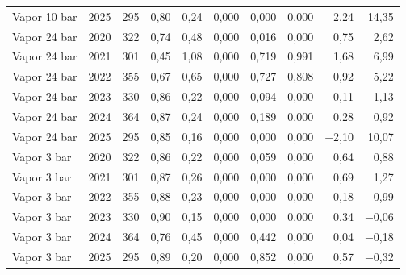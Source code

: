 {\begin{xltabular}{\linewidth}{@{}lrrrrrrrrr@{}}
Vapor 10 bar & 2025 & 295 & 0,80 & 0,24 & 0,000 & 0,000 & 0,000 & 2,24 & 14,35 \\
Vapor 24 bar & 2020 & 322 & 0,74 & 0,48 & 0,000 & 0,016 & 0,000 & 0,75 & 2,62 \\
Vapor 24 bar & 2021 & 301 & 0,45 & 1,08 & 0,000 & 0,719 & 0,991 & 1,68 & 6,99 \\
Vapor 24 bar & 2022 & 355 & 0,67 & 0,65 & 0,000 & 0,727 & 0,808 & 0,92 & 5,22 \\
Vapor 24 bar & 2023 & 330 & 0,86 & 0,22 & 0,000 & 0,094 & 0,000 & $-$0,11 & 1,13 \\
Vapor 24 bar & 2024 & 364 & 0,87 & 0,24 & 0,000 & 0,189 & 0,000 & 0,28 & 0,92 \\
Vapor 24 bar & 2025 & 295 & 0,85 & 0,16 & 0,000 & 0,000 & 0,000 & $-$2,10 & 10,07 \\
Vapor 3 bar & 2020 & 322 & 0,86 & 0,22 & 0,000 & 0,059 & 0,000 & 0,64 & 0,88 \\
Vapor 3 bar & 2021 & 301 & 0,87 & 0,26 & 0,000 & 0,000 & 0,000 & 0,69 & 1,27 \\
Vapor 3 bar & 2022 & 355 & 0,88 & 0,23 & 0,000 & 0,000 & 0,000 & 0,18 & $-$0,99 \\
Vapor 3 bar & 2023 & 330 & 0,90 & 0,15 & 0,000 & 0,000 & 0,000 & 0,34 & $-$0,06 \\
Vapor 3 bar & 2024 & 364 & 0,76 & 0,45 & 0,000 & 0,442 & 0,000 & 0,04 & $-$0,18 \\
Vapor 3 bar & 2025 & 295 & 0,89 & 0,20 & 0,000 & 0,852 & 0,000 & 0,57 & $-$0,32 \\
\end{xltabular}
}
